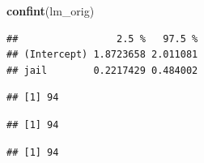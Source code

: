 \documentclass[]{article}
\newenvironment{Shaded}{\begin{snugshade}}{\end{snugshade}}
\newcommand{\CommentTok}[1]{\textcolor[rgb]{0.56,0.35,0.01}{\textit{#1}}}
\newcommand{\DecValTok}[1]{\textcolor[rgb]{0.00,0.00,0.81}{#1}}
\newcommand{\KeywordTok}[1]{\textcolor[rgb]{0.13,0.29,0.53}{\textbf{#1}}}
\newcommand{\NormalTok}[1]{#1}
\newcommand{\OperatorTok}[1]{\textcolor[rgb]{0.81,0.36,0.00}{\textbf{#1}}}
\newcommand{\StringTok}[1]{\textcolor[rgb]{0.31,0.60,0.02}{#1}}
\begin{document}
\begin{Shaded}
\begin{Highlighting}[]
\KeywordTok{confint}\NormalTok{(lm_orig)}
\end{Highlighting}
\end{Shaded}

\begin{verbatim}
##                 2.5 %   97.5 %
## (Intercept) 1.8723658 2.011081
## jail        0.2217429 0.484002
\end{verbatim}

\begin{Shaded}
\end{Shaded}

\begin{verbatim}
## [1] 94
\end{verbatim}

\begin{Shaded}
\end{Shaded}

\begin{verbatim}
## [1] 94
\end{verbatim}

\begin{Shaded}
\end{Shaded}

\begin{verbatim}
## [1] 94
\end{verbatim}

\begin{Shaded}
\end{Shaded}
\end{document}
